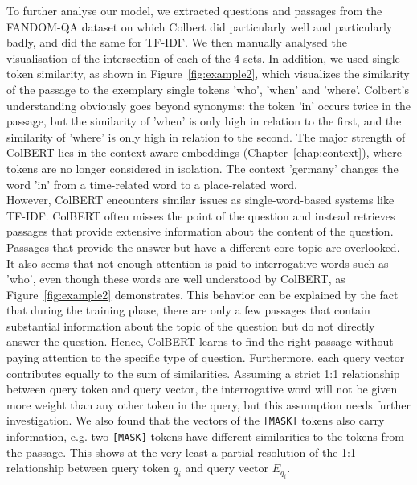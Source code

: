 \documentclass[11pt]{article}
\begin{document}
To further analyse our model, we extracted questions and passages from the FANDOM-QA dataset on which Colbert did particularly well and particularly badly, and did the same for TF-IDF. We then manually analysed the visualisation of the intersection of each of the 4 sets.
In addition, we used single token similarity, as shown in Figure~\ref{fig:example2}, which visualizes the similarity of the passage to the exemplary single tokens 'who', 'when' and 'where'. 
Colbert's understanding obviously goes beyond synonyms: the token 'in' occurs twice in the passage, but the similarity of 'when' is only high in relation to the first, and the similarity of 'where' is only high in relation to the second. 
The major strength of ColBERT lies in the context-aware embeddings (Chapter~\ref{chap:context}), where tokens are no longer considered in isolation.
The context 'germany' changes the word 'in' from a time-related word to a place-related word.
\\
However, ColBERT encounters similar issues as single-word-based systems like TF-IDF. 
ColBERT often misses the point of the question and instead retrieves passages that provide extensive information about the content of the question. Passages that provide the answer but have a different core topic are overlooked. 
It also seems that not enough attention is paid to interrogative words such as 'who', even though these words are well understood by ColBERT, as Figure~\ref{fig:example2} demonstrates.
This behavior can be explained by the fact that during the training phase, there are only a few passages that contain substantial information about the topic of the question but do not directly answer the question.
Hence, ColBERT learns to find the right passage without paying attention to the specific type of question.
Furthermore, each query vector contributes equally to the sum of similarities.
Assuming a strict 1:1 relationship between query token and query vector, the interrogative word will not be given more weight than any other token in the query, but this assumption needs further investigation. 
We also found that the vectors of the \texttt{[MASK]} tokens also carry information, e.g. two \texttt{[MASK]} tokens have different similarities to the tokens from the passage. This shows at the very least a partial resolution of the 1:1 relationship between query token $q_i$ and query vector $E_{q_i}$.
\end{document}
